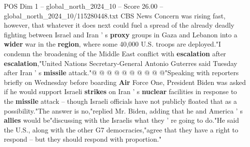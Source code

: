 \begin{textsample}{POS Dim 1 – global\_north\_2024\_10 – Score 26.00 – global\_north\_2024\_10/115280448.txt}
CBS News Concern was rising fast, however, that whatever it does next could fuel a spread of the already deadly fighting between Israel and Iran ' s \textbf{proxy} groups in Gaza and Lebanon into a \textbf{wider} war in the \textbf{region}, where some 40,000 U.S. troops are deployed."I condemn the broadening of the Middle East conflict with \textbf{escalation} after \textbf{escalation},"United Nations Secretary-General Antonio Guterres said Tuesday after Iran ' s \textbf{missile} attack."@ @ @ @ @ @ @ @ @ @"Speaking with reporters briefly on Wednesday before boarding \textbf{Air} Force One, President Biden was asked if he would support Israeli \textbf{strikes} on Iran ' s \textbf{nuclear} facilities in response to the \textbf{missile} attack -- though Israeli officials have not publicly floated that as a possibility."The answer is no,"replied Mr.
Biden, adding that he and America ' s \textbf{allies} would be"discussing with the Israelis what they ' re going to do."He said the U.S., along with the other G7 democracies,"agree that they have a right to respond -- but they should respond with proportion."

\end{textsample}
